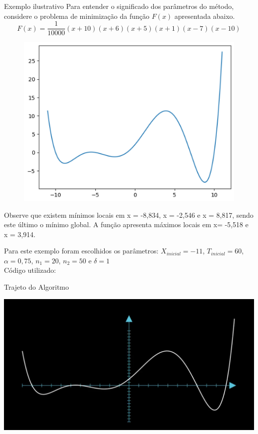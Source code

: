 \documentclass{beamer}
\begin{document}
\begin{frame}{Exemplo ilustrativo}
    Para entender o significado dos parâmetros do método, considere o problema de
minimização da função $F(x)$ apresentada abaixo.
    \begin{equation}
        F(x) = \frac{1}{10000}(x+10)(x+6)(x+5)(x+1)(x-7)(x-10)
    \end{equation}
    \begin{figure}
        \includegraphics[scale = 0.35]{src/PontoOtimo2.png}
    \end{figure}

Observe que existem mínimos locais em x = -8,834, x = -2,546 e x = 8,817, sendo este
último o mínimo global. A função apresenta máximos locais em x= -5,518 e x = 3,914.
\end{frame}

\begin{frame}
    Para este exemplo foram escolhidos os parâmetros: $X_{inicial} = -11$, $T_{inicial} = 60$, $\alpha = 0,75$, $n_1 = 20$, $n_2 = 50$ e $\delta = 1$\\
    Código utilizado:
    
\end{frame}

\begin{frame}
    Trajeto do Algoritmo
    \begin{center}
        \centering
        \href{https://youtu.be/rCaWnHfGmN0}{\includegraphics[width=\textheight, keepaspectratio]{src/capaVideoEx1.png}}
    \end{center}
\end{frame}
\end{document}
